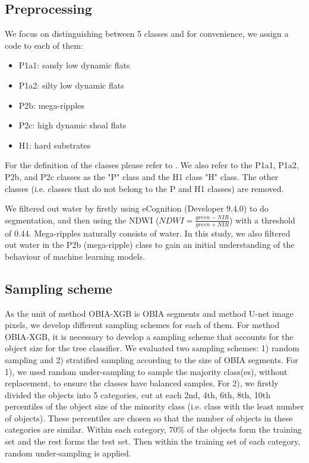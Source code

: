 \documentclass{isprs} %
\begin{document}
\subsection{Preprocessing}

We focus on distinguishing between 5 classes and for convenience, we assign a code to each of them: 
\begin{itemize} 
\item P1a1: sandy low dynamic flats  
\item P1a2: silty low dynamic flats 
\item P2b:  mega-ripples
\item P2c: high dynamic shoal flats
\item H1: hard substrates
\end{itemize} 

For the definition of the classes please refer to \cite{Douma2019}. We also refer to the P1a1, P1a2, P2b, and P2c classes as the "P" class and the H1 class "H" class. The other classes (i.e. classes that do not belong to the P and H1 classes) are removed. 

We filtered out water by firstly using eCognition (Developer 9.4.0) to do segmentation, and then using the NDWI ($NDWI = \frac{green - NIR}{green + NIR}$) with a threshold of 0.44. Mega-ripples naturally consists of water. In this study, we also filtered out water in the P2b (mega-ripple) class to gain an initial understanding of the behaviour of machine learning models.   

\subsection{Sampling scheme}
\label{cv}

As the unit of method OBIA-XGB is OBIA segments and method U-net image pixels, we develop different sampling schemes for each of them. For method OBIA-XGB, it is necessary to develop a sampling scheme that accounts for the object size for the tree classifier. We evaluated two sampling schemes: 1) random sampling and 2) stratified sampling according to the size of OBIA segments. For 1), we used random under-sampling to sample the majority class(es), without replacement, to ensure the classes have balanced samples. For 2), we firstly divided the objects into 5 categories, cut at each 2nd, 4th, 6th, 8th, 10th percentiles of the object size of the minority class (i.e. class with the least number of objects). These percentiles are chosen so that the number of objects in these categories are similar. Within each category, 70\% of the objects form the training set and the rest forms the test set. Then within the training set of each category, random under-sampling is applied. 
\end{document}
